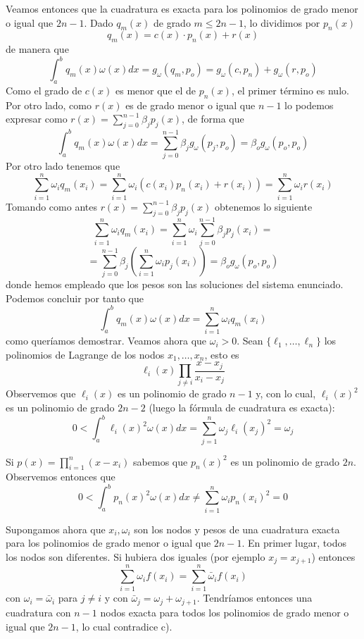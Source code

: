  \begin{dem}
    \item[a)] Veamos entonces que la cuadratura es exacta para los polinomios de grado menor o igual que $2n-1$. Dado $q_m(x)$ de grado $m\leq 2n-1$, lo dividimos por $p_n(x)$
    $$q_m(x)=c(x)\cdot p_n(x)+r(x)$$
    de manera que
    $$\int_a^b q_m(x)\omega(x)dx=g_{\omega}(q_m,p_o)=g_{\omega}(c,p_n)+g_{\omega}(r,p_o)$$
    Como el grado de $c(x)$ es menor que el de $p_n(x)$, el primer término es nulo. Por otro lado, como $r(x)$ es de grado menor o igual que $n-1$ lo podemos expresar como $r(x)=\sum_{j=0}^{n-1}\beta_jp_j(x)$, de forma que
    $$\int_a^b q_m(x)\omega(x)dx=\sum_{j=0}^{n-1}\beta_j g_{\omega}(p_j,p_o)=\beta_o g_{\omega}(p_o,p_o)$$
    Por otro lado tenemos que
    $$\sum_{i=1}^n\omega_iq_m(x_i)=\sum_{i=1}^n\omega_i(c(x_i)p_n(x_i)+r(x_i))=\sum_{i=1}^n\omega_ir(x_i)$$
    Tomando como antes $r(x)=\sum_{j=0}^{n-1}\beta_jp_j(x)$ obtenemos lo siguiente
    $$\sum_{i=1}^n\omega_iq_m(x_i)=\sum_{i=1}^n\omega_i\sum_{j=0}^{n-1}\beta_jp_j(x_i)=$$
    $$=\sum_{j=0}^{n-1}\beta_j\left(\sum_{i=1}^n\omega_i p_j(x_i)\right)=\beta_o g_{\omega}(p_o,p_o)$$
    donde hemos empleado que los pesos son las soluciones del sistema enunciado. Podemos concluir por tanto que
    $$\int_a^b q_m(x)\omega(x)dx=\sum_{i=1}^n\omega_iq_m(x_i)$$
    como queríamos demostrar. Veamos ahora que $\omega_i>0$. Sean $\{\ell_1,\ldots,\ell_n\}$ los polinomios de Lagrange de los nodos $x_1,\ldots,x_n$, esto es
    $$\ell_i(x)\prod_{j\neq i}\dfrac{x-x_j}{x_i-x_j}$$
    Observemos que $\ell_i(x)$ es un polinomio de grado $n-1$ y, con lo cual, $\ell_i(x)^2$ es un polinomio de grado $2n-2$ (luego la fórmula de cuadratura es exacta):
    $$0<\int_a^b\ell_i(x)^2\omega(x)dx=\sum_{j=1}^n\omega_j\ell_i(x_j)^2=\omega_j$$
    \item[c)] Si $p(x)=\prod_{i=1}^n(x-x_i)$ sabemos que $p_n(x)^2$ es un polinomio de grado $2n$. Observemos entonces que
    $$0<\int_a^bp_n(x)^2\omega(x)dx\neq\sum_{i=1}^n\omega_ip_n(x_i)^2=0$$
    \item[b)] Supongamos ahora que $x_i,\omega_i$ son los nodos y pesos de una cuadratura exacta para los polinomios de grado menor o igual que $2n-1$. En primer lugar, todos los nodos son diferentes. Si hubiera dos iguales (por ejemplo $x_j=x_{j+1}$) entonces
    $$\sum_{i=1}^n\omega_if(x_i)=\sum_{i=1}^n\bar{\omega}_if(x_i)$$
    con $\omega_i=\bar{\omega}_i$ para $j\neq i$ y con $\bar{\omega}_j=\omega_j+\omega_{j+1}$. Tendríamos entonces una cuadratura con $n-1$ nodos exacta para todos los polinomios de grado menor o igual que $2n-1$, lo cual contradice c).


\end{dem}
